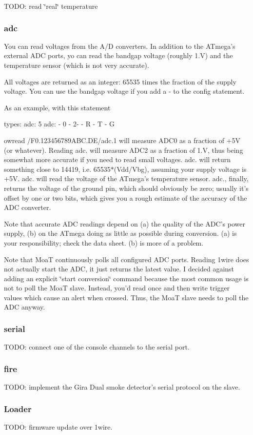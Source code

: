 T\-O\-D\-O\-: read \char`\"{}real\char`\"{} temperature

\subsubsection*{adc}

You can read voltages from the A/\-D converters. In addition to the A\-Tmega's external A\-D\-C ports, yo can read the bandgap voltage (roughly 1.\-V) and the temperature sensor (which is not very accurate).

All voltages are returned as an integer\-: 65535 times the fraction of the supply voltage. You can use the bandgap voltage if you add a {\ttfamily -\/} to the config statement.

As an example, with this statement \begin{DoxyVerb}types:
  adc: 5
adc:
  - 0
  - 2-
  - R
  - T
  - G
\end{DoxyVerb}


{\ttfamily owread /\-F0.123456789\-A\-B\-C.\-D\-E/adc.1} will measure A\-D\-C0 as a fraction of +5\-V (or whatever). Reading {\ttfamily adc.} will measure A\-D\-C2 as a fraction of 1.\-V, thus being somewhat more accurate if you need to read small voltages. {\ttfamily adc.} will return something close to 14419, i.\-e. 65535$\ast$(Vdd/\-Vbg), assuming your supply voltage is +5\-V. {\ttfamily adc.} will read the voltage of the A\-Tmega's temperature sensor. {\ttfamily adc.}, finally, returns the voltage of the ground pin, which should obviously be zero; usually it's offset by one or two bits, which gives you a rough estimate of the accuracy of the A\-D\-C converter.

Note that accurate A\-D\-C readings depend on (a) the quality of the A\-D\-C's power supply, (b) on the A\-Tmega doing as little as possible during conversion. (a) is your responsibility; check the data sheet. (b) is more of a problem.

Note that Moa\-T continuously polls all configured A\-D\-C ports. Reading 1wire does not actually start the A\-D\-C, it just returns the latest value. I decided against adding an explicit \char`\"{}start conversion\char`\"{} command because the most common usage is not to poll the Moa\-T slave. Instead, you'd read once and then write trigger values which cause an alert when crossed. Thus, the Moa\-T slave needs to poll the A\-D\-C anyway.

\subsubsection*{serial}

T\-O\-D\-O\-: connect one of the console channels to the serial port.

\subsubsection*{fire}

T\-O\-D\-O\-: implement the Gira Dual smoke detector's serial protocol on the slave.

\subsubsection*{Loader}

T\-O\-D\-O\-: firmware update over 1wire. 